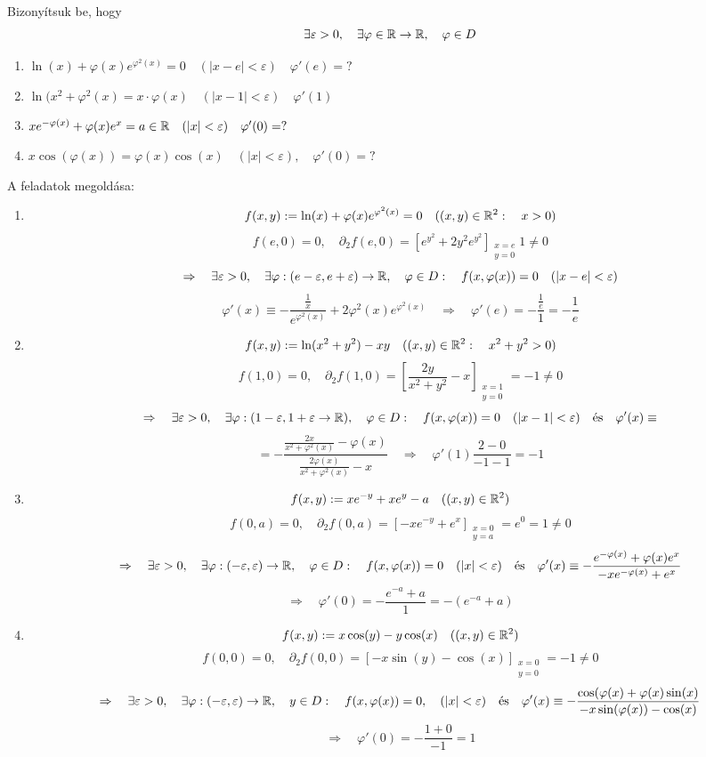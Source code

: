 \documentclass[a4paper,11.5pt]{article}
\begin{document}
	\begin{task}
		Bizonyítsuk be, hogy
		\[ \exists\varepsilon>0,\quad \exists\varphi\in\mathbb{R}\to\mathbb{R},\quad \varphi\in D \]
		\begin{enumerate}
			\item $\ln(x)+\varphi(x)e^{\varphi^2(x)}=0\quad (|x-e|<\varepsilon)\quad \varphi'(e)=?$
			\item $\ln(x^2+\varphi^2(x)=x\cdot \varphi(x)\quad (|x-1|<\varepsilon)\quad \varphi'(1)$
			\item $ xe^{-\varphi(x)}+\varphi(x)e^x=a\in\mathbb{R}\quad (|x|<\varepsilon)\quad \varphi'(0)=?$
			\item $x\cos(\varphi(x))=\varphi(x)\cos(x)\quad (|x|<\varepsilon),\quad \varphi'(0)=?$
		\end{enumerate}
		A feladatok megoldása:
		\begin{enumerate}
			\item 
			\[ f(x,y):=\ln(x)+\varphi(x)e^{\varphi^2(x)}=0\quad ((x,y)\in\mathbb{R}^2:\quad x>0) \]
			\[ f(e,0)=0,\quad \partial_2f(e,0)=\left[e^{y^2}+2y^2e^{y^2}\right]_{\substack{x=e\\y=0}}1\not=0 \]
			\[ \Rightarrow\quad \exists\varepsilon>0,\quad \exists\varphi:(e-\varepsilon,e+\varepsilon)\to\mathbb{R},\quad \varphi\in D:\quad f(x,\varphi(x))=0\quad (|x-e|<\varepsilon) \]
			\[ \varphi'(x)\equiv -\frac{\frac{1}{x}}{e^{\varphi^2(x)}}+2\varphi^2(x)e^{\varphi^2(x)}\quad \Rightarrow\quad \varphi'(e)=-\frac{\frac{1}{e}}{1}=-\frac{1}{e} \]
			\item \[ f(x,y):=\ln(x^2+y^2)-xy\quad ((x,y)\in\mathbb{R}^2:\quad x^2+y^2>0) \]
			\[ f(1,0)=0,\quad \partial_2f(1,0)=\left[\frac{2y}{x^2+y^2}-x\right]_{\substack{x=1\\y=0}}=-1\not=0 \]
			\[ \Rightarrow\quad \exists\varepsilon>0,\quad \exists\varphi:(1-\varepsilon,1+\varepsilon\to\mathbb{R}),\quad \varphi\in D:\quad f(x,\varphi(x))=0\quad (|x-1|<\varepsilon)\quad \text{és}\quad \varphi'(x)\equiv \]
			\[=-\frac{\frac{2x}{x^2+\varphi^2(x)}-\varphi(x)}{\frac{2\varphi(x)}{x^2+\varphi^2(x)}-x} \quad \Rightarrow\quad \varphi'(1)\frac{2-0}{-1-1}=-1 \]
			\item
			\[ f(x,y):=xe^{-y}+xe^y-a\quad ((x,y)\in\mathbb{R}^2) \]
			\[ f(0,a)=0,\quad \partial_2f(0,a)=\left[-xe^{-y}+e^x\right]_{\substack{x=0\\y=a}}=e^0=1\not=0 \]
			\[ \Rightarrow\quad \exists\varepsilon>0,\quad \exists\varphi:(-\varepsilon,\varepsilon)\to\mathbb{R},\quad \varphi\in D:\quad f(x,\varphi(x))=0\quad (|x|<\varepsilon)\quad \text{és}\quad \varphi'(x)\equiv -\frac{e^{-\varphi(x)}+\varphi(x)e^x}{-xe^{-\varphi(x)}+e^x} \]
			\[ \Rightarrow\quad \varphi'(0)=-\frac{e^{-a}+a}{1}=-(e^{-a}+a) \]
			\item \[ f(x,y):=x\cos(y)-y\cos(x)\quad ((x,y)\in\mathbb{R}^2) \]
			\[ f(0,0)=0,\quad \partial_2f(0,0)=[-x\sin(y)-\cos(x)]_{\substack{x=0\\y=0}}=-1\not=0 \]
			\[ \Rightarrow\quad \exists\varepsilon>0,\quad \exists\varphi:(-\varepsilon,\varepsilon)\to\mathbb{R},\quad y\in D:\quad f(x,\varphi(x))=0,\quad (|x|<\varepsilon)\quad \text{és}\quad \varphi'(x)\equiv -\frac{\cos(\varphi(x)+\varphi(x)\sin(x)}{-x\sin(\varphi(x))-\cos(x)} \]
			\[ \Rightarrow\quad \varphi'(0)=-\frac{1+0}{-1}=1 \]
		\end{enumerate}
	\end{task}
\end{document}
